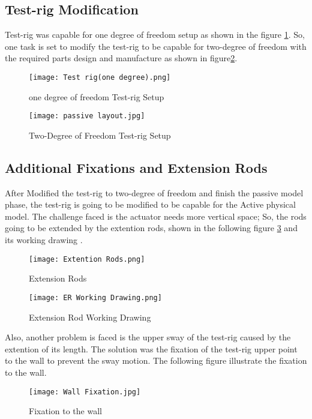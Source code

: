 \subsection{Test-rig Modification}
Test-rig was capable for one degree of freedom setup as shown in the figure \ref{fig:One Degree of freedom Test-rig Setup}. So, one task is set to modify the test-rig to be capable for two-degree of freedom with the required parts design and manufacture as shown in figure\ref{fig:Two-Degree of Freedom Test-rig Setup}.
\begin{figure}[H]
    \centering
    \texttt{[image: Test rig(one degree).png]}
    \caption{one degree of freedom Test-rig Setup}
    \label{fig:One Degree of freedom Test-rig Setup}
\end{figure}
\begin{figure}[H]
    \centering
    \texttt{[image: passive layout.jpg]}
    \caption{Two-Degree of Freedom Test-rig Setup}
    \label{fig:Two-Degree of Freedom Test-rig Setup}
\end{figure}
\newpage
\subsection{Additional Fixations and Extension Rods}
After Modified the test-rig to two-degree of freedom and finish the passive model phase, the test-rig is going to be modified to be capable for the Active physical model. The challenge faced is the actuator needs more vertical space; So, the rods going to be extended by the extention rods, shown in the following figure \ref{fig:Extension Rods} and its working drawing .
\begin{figure}[H]
    \centering
    \texttt{[image: Extention Rods.png]}
    \caption{Extension Rods}
    \label{fig:Extension Rods}
\end{figure}
\begin{figure}[H]
    \centering
    \texttt{[image: ER Working Drawing.png]}
    \caption{Extension Rod Working Drawing}
    \label{fig:Extension Rod Working Drawing}
\end{figure}
\newpage
Also, another problem is faced is the upper sway of the test-rig caused by the extention of its length. The solution was the fixation of the test-rig upper point to the wall to prevent the sway motion.
\newline
The following figure illustrate the fixation to the wall.  
\begin{figure}[H]
    \centering
    \texttt{[image: Wall Fixation.jpg]}
    \caption{Fixation to the wall}
    \label{fig:Fixation}
\end{figure}

